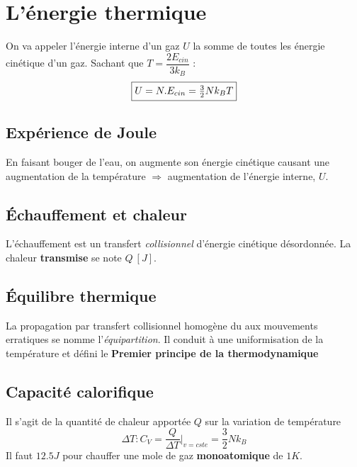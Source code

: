 \documentclass	[11pt, a4paper, openany]{book}
\begin{document}
\section{L'énergie thermique}
On va appeler l'énergie interne d'un gaz $U$ la somme de toutes les énergie cinétique d'un gaz. Sachant que $T = \dfrac{2E_{cin}}{3k_B}$ :
\begin{equation}
\fbox{$ U = N.E_{cin} = \frac{3}{2}Nk_BT$}
\end{equation}


\subsection{Expérience de Joule}
En faisant bouger de l'eau, on augmente son énergie cinétique causant une augmentation de la température $\Rightarrow$ augmentation de l'énergie interne, $U$.

\subsection{Échauffement et chaleur}
L'échauffement est un transfert \textit{collisionnel} d'énergie cinétique désordonnée. La chaleur \textbf{transmise} se note $Q\ [J]$.

\subsection{Équilibre thermique}
La propagation par transfert collisionnel homogène du aux mouvements erratiques se nomme l'\textit{équipartition}. Il conduit à une uniformisation de la température et défini le \textbf{Premier principe de la thermodynamique}
\begin{center}
\end{center}

\subsection{Capacité calorifique}
Il s'agit de la quantité de chaleur apportée $Q$ sur la variation de température 
\begin{equation}
\Delta T : C_V = \dfrac{Q}{\Delta T}|_{v=cste} = \frac{3}{2}Nk_B
\end{equation}
Il faut $12.5J$ pour chauffer une mole de gaz \textbf{monoatomique} de $1K$.
\end{document}
